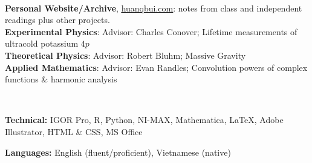 \documentclass[letter, 10pt]{article}
\newcommand{\longunderline}[1]{\uline{#1\hfill\mbox{}}}
\begin{document}
	\noindent \longunderline{\normalsize{{}}}
	\\ \vspace{-7pt}
	
	\noindent \textbf{Personal Website/Archive}, \href{https://huanqbui.com}{\underline{huanqbui.com}}: notes from class and independent readings plus other projects.\\ %
	\noindent \textbf{Experimental Physics}: Advisor: Charles Conover; Lifetime measurements of ultracold potassium $4p$\\
	\noindent \textbf{Theoretical Physics}: Advisor: Robert Bluhm; Massive Gravity\\
	\noindent \textbf{Applied Mathematics}: Advisor: Evan Randles; Convolution powers of complex functions \& harmonic analysis\\
	\vspace{-7pt} 
	
		\noindent \longunderline{\normalsize{{}}}
	\\ \vspace{-7pt}
	
	\noindent \textbf{Technical:} IGOR Pro, R, Python,  NI-MAX, Mathematica, \LaTeX{}, Adobe Illustrator, HTML \& CSS, MS Office
	
	\noindent \textbf{Languages:} English (fluent/proficient), Vietnamese (native)\\
	\vspace{-7pt}

	

	
%	

	
\end{document}
